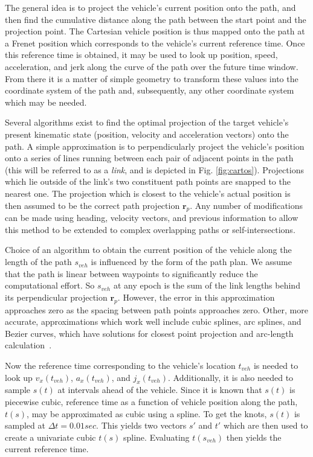 \documentclass[letterpaper, 10 pt, conference]{ieeeconf}  %
\begin{document}
The general idea is to project the vehicle's current position onto the path, and then find the cumulative distance along the path between the start point and the projection point.
The Cartesian vehicle position is thus mapped onto the path at a Frenet position which corresponds to the vehicle's current reference time.
Once this reference time is obtained, it may be used to look up position, speed, acceleration, and jerk along the curve of the path over the future time window.
From there it is a matter of simple geometry to transform these values into the coordinate system of the path and, subsequently, any other coordinate system which may be needed.


Several algorithms exist to find the optimal projection of the target vehicle's present kinematic state (position, velocity and acceleration vectors) onto the path.
A simple approximation is to perpendicularly project the vehicle's position onto a series of lines running between each pair of adjacent points in the path (this will be referred to as a {\it link}, and is depicted in Fig. \ref{fig:cartos}).
Projections which lie outside of the link's two constituent path points are snapped to the nearest one.
The projection which is closest to the vehicle's actual position is then assumed to be the correct path projection $\mathbf{r}_p$.
Any number of modifications can be made using heading, velocity vectors, and previous information to allow this method to be extended to complex overlapping paths or self-intersections.


Choice of an algorithm to obtain the current position of the vehicle along the length of the path $s_{veh}$ is influenced by the form of the path plan.
We assume that the path is linear between waypoints to significantly reduce the computational effort.
So $s_{veh}$ at any epoch is the sum of the link lengths behind its perpendicular projection $\mathbf{r}_p$.
However, the error in this approximation approaches zero as the spacing between path points approaches zero.
Other, more accurate, approximations which work well include cubic splines, arc splines, and Bezier curves, which have solutions for closest point projection and arc-length calculation~\cite{Wang2002,Wang2003,Schindler2011}.

Now the reference time corresponding to the vehicle's location $t_{veh}$ is needed to look up $v_{x}(t_{veh})$, $a_{x}(t_{veh})$, and $j_{x}(t_{veh})$.
Additionally, it is also needed to sample $s(t)$ at intervals ahead of the vehicle.
Since it is known that $s(t)$ is piecewise cubic, reference time as a function of vehicle position along the path, $t(s)$, may be approximated as cubic using a spline.
To get the knots, $s(t)$ is sampled at $\Delta t = 0.01 sec$.
This yields two vectors $s'$ and $t'$ which are then used to create a univariate cubic $t(s)$ spline.
Evaluating $t(s_{veh})$ then yields the current reference time.
\end{document}
